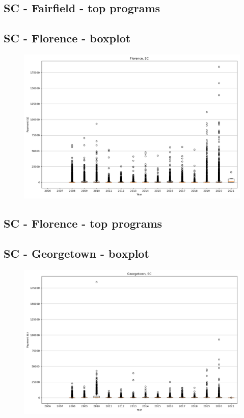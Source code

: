 \subsection*{SC - Fairfield - top programs}

\newpage
\subsection*{SC - Florence - boxplot}
\begin{figure}[h]
\centering
\includegraphics[width=7in]{../output/boxplots/counties/Florence-SC_boxplot.png}
\end{figure}


\subsection*{SC - Florence - top programs}

\newpage
\subsection*{SC - Georgetown - boxplot}
\begin{figure}[h]
\centering
\includegraphics[width=7in]{../output/boxplots/counties/Georgetown-SC_boxplot.png}
\end{figure}


